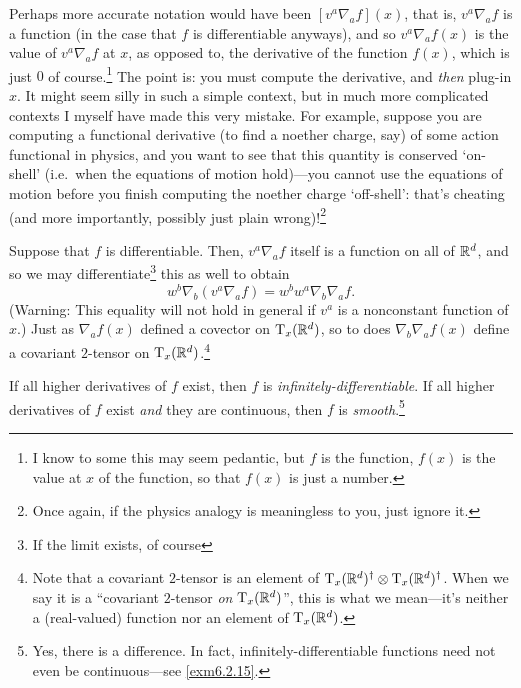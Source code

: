 \begin{dfn}
\begin{rmk}
Perhaps more accurate notation would have been $[v^a\nabla _af](x)$, that is, $v^a\nabla _af$ is a function (in the case that $f$ is differentiable anyways), and so $v^a\nabla _af(x)$ is the value of $v^a\nabla _af$ at $x$, as opposed to, the derivative of the function $f(x)$, which is just $0$ of course.\footnote{I know to some this may seem pedantic, but $f$ is the function, $f(x)$ is the value at $x$ of the function, so that $f(x)$ is just a number.}  The point is:  you must compute the derivative, and \emph{then} plug-in $x$.  It might seem silly in such a simple context, but in much more complicated contexts I myself have made this very mistake.  For example, suppose you are computing a functional derivative (to find a noether charge, say) of some action functional in physics, and you want to see that this quantity is conserved `on-shell' (i.e.~when the equations of motion hold)---you cannot use the equations of motion before you finish computing the noether charge `off-shell':  that's cheating (and more importantly, possibly just plain wrong)!\footnote{Once again, if the physics analogy is meaningless to you, just ignore it.}
\end{rmk}
\begin{rmk}
Suppose that $f$ is differentiable.  Then, $v^a\nabla _af$ itself is a function on all of $\R ^d$, and so we may differentiate\footnote{If the limit exists, of course} this as well to obtain
\begin{equation}
w^b\nabla _b(v^a\nabla _af)=w^bw^a\nabla _b\nabla _af.
\end{equation}
(Warning:  This equality will not hold in general if $v^a$ is a nonconstant function of $x$.)  Just as $\nabla _af(x)$ defined a covector on $\tangent{\R ^d}{x}$, so to does $\nabla _b\nabla _af(x)$ define a covariant $2$-tensor on $\tangent{\R ^d}{x}$.\footnote{Note that a covariant $2$-tensor is an element of $\tangent{\R ^d}{x}^\dagger \otimes \tangent{\R ^d}{x}^\dagger$.  When we say it is a ``covariant $2$-tensor \emph{on} $\tangent{\R ^d}{x}$'', this is what we mean---it's neither a (real-valued) function nor an element of $\tangent{\R ^d}{x}$.}
\end{rmk}
\begin{rmk}
If all higher derivatives of $f$ exist, then $f$ is \emph{infinitely-differentiable}.  If all higher derivatives of $f$ exist \emph{and} they are continuous, then $f$ is \emph{smooth}.\footnote{Yes, there is a difference.  In fact, infinitely-differentiable functions need not even be continuous---see \cref{exm6.2.15}.}
\end{rmk}
\end{dfn}
